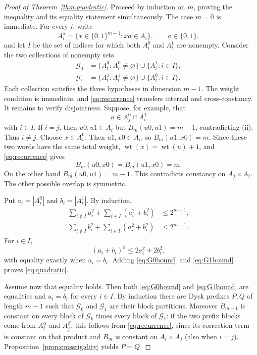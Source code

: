 \documentclass[11pt]{article}
\theoremstyle{definition}
\newcommand{\wt}{\operatorname{wt}}
\newcommand{\bits}{\{0,1\}}
\begin{document}
\begin{proof}[Proof of Theorem~\ref{thm:quadratic}]
Proceed by induction on $m$, proving the inequality and its equality statement simultaneously.  The case $m=0$ is immediate.  For every $i$, write
\[
 A_i^a=\{x\in\bits^{m-1}:xa\in A_i\},\qquad a\in\bits,
\]
and let $I$ be the set of indices for which both $A_i^0$ and $A_i^1$ are nonempty.  Consider the two collections of nonempty sets
\begin{align*}
 \mathcal G_0&=\{A_i^0:A_i^0\ne\varnothing\}\cup\{A_i^1:i\in I\},\\
 \mathcal G_1&=\{A_i^1:A_i^1\ne\varnothing\}\cup\{A_i^0:i\in I\}.\end{align*}
Each collection satisfies the three hypotheses in dimension $m-1$.  The weight condition is immediate, and \eqref{eq:recurrence} transfers internal and cross-constancy.  It remains to verify disjointness.  Suppose, for example, that
\[
 u\in A_j^0\cap A_i^1
\]
with $i\in I$.  If $i=j$, then $u0,u1\in A_i$ but $B_m(u0,u1)=m-1$, contradicting (ii).  Thus $i\ne j$.  Choose $x\in A_i^0$.  Then $u1,x0\in A_i$, so $B_m(u1,x0)=m$.  Since these two words have the same total weight, $\wt(x)=\wt(u)+1$, and \eqref{eq:recurrence} gives
\[
 B_m(u0,x0)=B_m(u1,x0)=m.
\]
On the other hand $B_m(u0,u1)=m-1$.  This contradicts constancy on $A_j\times A_i$.  The other possible overlap is symmetric.

Put $a_i=|A_i^0|$ and $b_i=|A_i^1|$.  By induction,
\begin{align}
 \sum_{i\notin I}a_i^2+\sum_{i\in I}(a_i^2+b_i^2)&\le2^{m-1},\label{eq:G0bound}\\
 \sum_{i\notin I}b_i^2+\sum_{i\in I}(a_i^2+b_i^2)&\le2^{m-1}.\label{eq:G1bound}
\end{align}
For $i\in I$,
\[
 (a_i+b_i)^2\le2a_i^2+2b_i^2,
\]
with equality exactly when $a_i=b_i$.  Adding \eqref{eq:G0bound} and \eqref{eq:G1bound} proves \eqref{eq:quadratic}.

Assume now that equality holds.  Then both \eqref{eq:G0bound} and \eqref{eq:G1bound} are equalities and $a_i=b_i$ for every $i\in I$.  By induction there are Dyck prefixes $P,Q$ of length $m-1$ such that $\mathcal G_0$ and $\mathcal G_1$ are their block partitions.  Moreover $B_{m-1}$ is constant on every block of $\mathcal G_0$ times every block of $\mathcal G_1$: if the two prefix blocks come from $A_i^\alpha$ and $A_j^\beta$, this follows from \eqref{eq:recurrence}, since its correction term is constant on that product and $B_m$ is constant on $A_i\times A_j$ (also when $i=j$).  Proposition~\ref{prop:crossrigidity} yields $P=Q$.


\end{proof}
\end{document}
